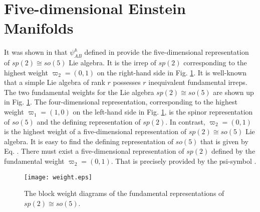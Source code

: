 \documentclass[12pt,epsf]{article}
\begin{document}
\section{Five-dimensional Einstein Manifolds}



It was shown in  that $\psi^\mathbb{A}_{AB}$ defined in  provide the five-dimensional
representation of $sp(2) \cong so(5)$ Lie algebra. It is the irrep of $sp(2)$ corresponding to the highest weight
$\varpi_2 =(0,1)$ on the right-hand side in Fig. \ref{b-weight-diagram}.
It is well-known \cite{georgi-book} that a simple Lie algebra of rank $r$ possesses $r$ inequivalent fundamental irreps.
The two fundamental weights for the Lie algebra $sp(2) \cong so(5)$ are shown up in Fig. \ref{b-weight-diagram}.
The four-dimensional representation, corresponding to the highest weight
$\varpi_1 =(1,0)$ on the left-hand side in Fig. \ref{b-weight-diagram}, is the spinor representation of
$so(5)$ and the defining representation of $sp(2)$. In contrast, $\varpi_2 =(0,1)$ is the highest weight of
a five-dimensional representation of $sp(2) \cong so(5)$ Lie algebra.
It is easy to find the defining representation of $so(5)$ that is given by Eq. .
There must exist a five-dimensional representation of $sp(2)$ defined by the fundamental weight
$\varpi_2 =(0,1)$. That is precisely provided by the psi-symbol .



\begin{figure}
\centering
\texttt{[image: weight.eps]}
\caption{The block weight diagrams of the fundamental representations of $sp(2) \cong so(5)$.}
\label{b-weight-diagram}
\end{figure}
\end{document}
